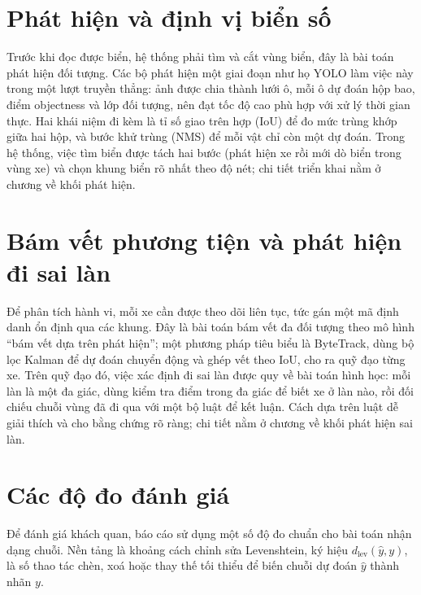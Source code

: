 \documentclass[12pt,a4paper]{report}
\begin{document}
\section{Phát hiện và định vị biển số}
Trước khi đọc được biển, hệ thống phải tìm và cắt vùng biển, đây là bài toán phát hiện đối tượng. Các bộ phát hiện một giai đoạn như họ YOLO làm việc này trong một lượt truyền thẳng: ảnh được chia thành lưới ô, mỗi ô dự đoán hộp bao, điểm objectness và lớp đối tượng, nên đạt tốc độ cao phù hợp với xử lý thời gian thực. Hai khái niệm đi kèm là tỉ số giao trên hợp (IoU) để đo mức trùng khớp giữa hai hộp, và bước khử trùng (NMS) để mỗi vật chỉ còn một dự đoán. Trong hệ thống, việc tìm biển được tách hai bước (phát hiện xe rồi mới dò biển trong vùng xe) và chọn khung biển rõ nhất theo độ nét; chi tiết triển khai nằm ở chương về khối phát hiện.

\section{Bám vết phương tiện và phát hiện đi sai làn}
Để phân tích hành vi, mỗi xe cần được theo dõi liên tục, tức gán một mã định danh ổn định qua các khung. Đây là bài toán bám vết đa đối tượng theo mô hình ``bám vết dựa trên phát hiện''; một phương pháp tiêu biểu là ByteTrack, dùng bộ lọc Kalman để dự đoán chuyển động và ghép vết theo IoU, cho ra quỹ đạo từng xe. Trên quỹ đạo đó, việc xác định đi sai làn được quy về bài toán hình học: mỗi làn là một đa giác, dùng kiểm tra điểm trong đa giác để biết xe ở làn nào, rồi đối chiếu chuỗi vùng đã đi qua với một bộ luật để kết luận. Cách dựa trên luật dễ giải thích và cho bằng chứng rõ ràng; chi tiết nằm ở chương về khối phát hiện sai làn.

\section{Các độ đo đánh giá}
Để đánh giá khách quan, báo cáo sử dụng một số độ đo chuẩn cho bài toán nhận dạng chuỗi. Nền tảng là khoảng cách chỉnh sửa Levenshtein, ký hiệu $d_\text{lev}(\hat{y}, y)$, là số thao tác chèn, xoá hoặc thay thế tối thiểu để biến chuỗi dự đoán $\hat{y}$ thành nhãn $y$.
\end{document}
